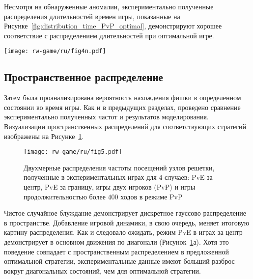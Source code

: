 Несмотря на обнаруженные аномалии, экспериментально полученные распределения длительностей времен игры, показанные на Рисунке~\cref{fig:distribution_time_PvP_optimal}, демонстрируют хорошее соответствие с распределением длительностей при оптимальной игре. 

\begin{figure*}[t]
    \centering
    \texttt{[image: rw-game/ru/fig4n.pdf]}
    \caption{
        Распределение времени поглощения для режима PvP, полученным в эксперименте (желтая гистограмма) и в модели на основе популяционных стратегий (фиолетовая пунктирная линия) по сравнению с оптимальной стратегией (фиолетовая линия) и случайным блужданием (красная линия)
    }  
    \label{fig:distribution_time_PvP_optimal}

\end{figure*}


\subsection{Пространственное распределение}\label{subsec:ch3/sec4/sub4}

Затем была проанализирована вероятность нахождения фишки в определенном состоянии во время игры. Как и в предыдущих разделах, проведено сравнение экспериментально полученных частот и результатов моделирования. Визуализации пространственных распределений для соответствующих стратегий изображены на Рисунке~\cref{fig:distribution_states}.

\begin{figure}[!ht]
    \centering
    \texttt{[image: rw-game/ru/fig5.pdf]}
    \caption{
        Двухмерные распределения частоты посещений узлов решетки, полученные в экспериментальных играх для 4 случаев: PvE за центр, PvE за границу, игры двух игроков (PvP) и игры продолжительностью более $400$ ходов в режиме PvP
    }  
    \label{fig:distribution_states}
    
\end{figure}

Чистое случайное блуждание демонстрирует дискретное гауссово распределение в пространстве. Добавление игровой динамики, в свою очередь, меняет итоговую картину распределения. Как и следовало ожидать, режим PvE в играх за центр демонстрирует в основном движения по диагонали (Рисунок~\cref{fig:distribution_states}а). Хотя это поведение совпадает с пространственным распределением в предложенной оптимальной стратегии, экспериментальные данные имеют больший разброс вокруг диагональных состояний, чем для оптимальной стратегии.

